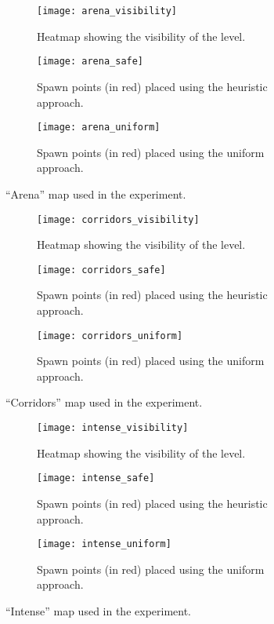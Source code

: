 \begin{figure}[p]
\centering
\begin{subfigure}[t]{0.3\linewidth}
\texttt{[image: arena\_visibility]}
\caption{Heatmap showing the visibility of the level.}
\label{img:arena_visibility}
\end{subfigure} 
\hfil
\begin{subfigure}[t]{0.3\linewidth}
\texttt{[image: arena\_safe]}
\caption{Spawn points (in red) placed using the heuristic approach.}
\label{img:arena_safe}
\end{subfigure}
\hfil
\begin{subfigure}[t]{0.3\linewidth}
\texttt{[image: arena\_uniform]}
\caption{Spawn points (in red) placed using the uniform approach.}
\label{img:arena_uniform}
\end{subfigure} 
\caption{``Arena'' map used in the experiment.}
\label{img:arena}
\vspace{0.4cm}
\begin{subfigure}[t]{0.3\linewidth}
\texttt{[image: corridors\_visibility]}
\caption{Heatmap showing the visibility of the level.}
\label{img:corridors_visibility}
\end{subfigure} 
\hfil
\begin{subfigure}[t]{0.3\linewidth}
\texttt{[image: corridors\_safe]}
\caption{Spawn points (in red) placed using the heuristic approach.}
\label{img:corridors_safe}
\end{subfigure}
\hfil
\begin{subfigure}[t]{0.3\linewidth}
\texttt{[image: corridors\_uniform]}
\caption{Spawn points (in red) placed using the uniform approach.}
\label{img:corridors_uniform}
\end{subfigure} 
\caption{``Corridors'' map used in the experiment.}
\label{img:corridors}
\vspace{0.4cm}
\begin{subfigure}[t]{0.3\linewidth}
\texttt{[image: intense\_visibility]}
\caption{Heatmap showing the visibility of the level.}
\label{img:intense_visibility}
\end{subfigure} 
\hfil
\begin{subfigure}[t]{0.3\linewidth}
\texttt{[image: intense\_safe]}
\caption{Spawn points (in red) placed using the heuristic approach.}
\label{img:intense_safe}
\end{subfigure}
\hfil
\begin{subfigure}[t]{0.3\linewidth}
\texttt{[image: intense\_uniform]}
\caption{Spawn points (in red) placed using the uniform approach.}
\label{img:intense_uniform}
\end{subfigure}
\caption{``Intense'' map used in the experiment.}
\label{img:intense} 
\end{figure}

